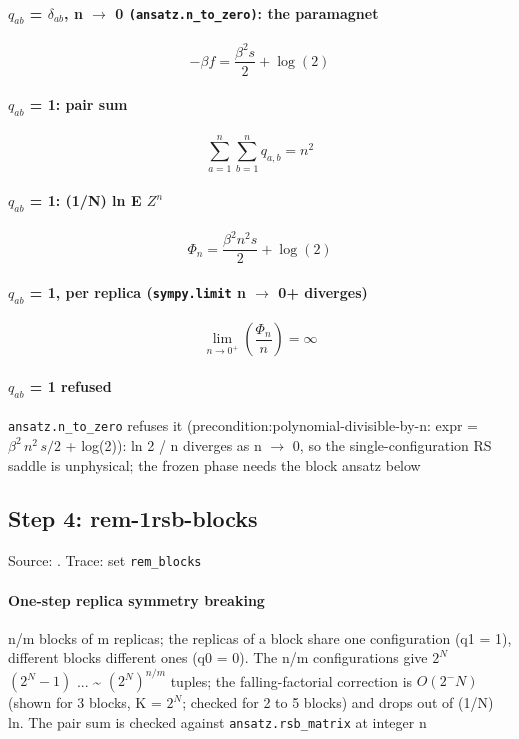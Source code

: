 \documentclass[11pt]{article}
\begin{document}
\paragraph{$q_{ab}$ = $\delta _{ab}$, n $\to$ 0 \texttt{(ansatz.n\_to\_zero)}: the paramagnet}
\begin{equation}
- \beta f = \frac{\beta^{2} s}{2} + \log{\left(2 \right)}
\end{equation}
\paragraph{$q_{ab}$ = 1: pair sum}
\begin{equation}
\sum_{a=1}^{n} \sum_{b=1}^{n} {q}_{a,b} = n^{2}
\end{equation}
\paragraph{$q_{ab}$ = 1: (1/N) ln E $Z^{n}$}
\begin{equation}
\Phi_{n} = \frac{\beta^{2} n^{2} s}{2} + \log{\left(2 \right)}
\end{equation}
\paragraph{$q_{ab}$ = 1, per replica (\texttt{sympy.limit} n $\to$ 0+ diverges)}
\begin{equation}
\lim_{n \to 0^+}\left(\frac{\Phi_{n}}{n}\right) = \infty
\end{equation}
\paragraph{$q_{ab}$ = 1 refused}
\texttt{ansatz.n\_to\_zero} refuses it (precondition:polynomial-divisible-by-n: expr = $\beta ^{2}\,n^{2}\,s/2$ + log(2)): ln 2 / n diverges as n $\to$ 0, so the single-configuration RS saddle is unphysical; the frozen phase needs the block ansatz below
\subsection{Step 4: rem-1rsb-blocks}
Source: \cite{b3,b4}. Trace: set \texttt{rem\_blocks}

\paragraph{One-step replica symmetry breaking}
n/m blocks of m replicas; the replicas of a block share one configuration (q1 = 1), different blocks different ones (q0 = 0).  The n/m configurations give $2^{N}$ $(2^{N} - 1)$ ... \~{} $(2^{N})^{n/m}$ tuples; the falling-factorial correction is $O(2^-N)$ (shown for 3 blocks, K = $2^{N}$; checked for 2 to 5 blocks) and drops out of (1/N) ln.  The pair sum is checked against \texttt{ansatz.rsb\_matrix} at integer n
\end{document}
